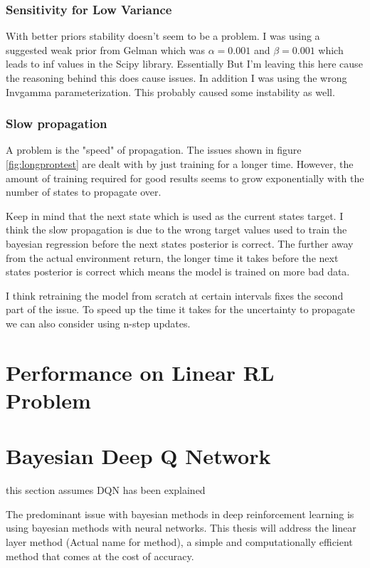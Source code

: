 \subsubsection{Sensitivity for Low Variance}

With better priors stability doesn't seem to be a problem. I was using a suggested weak prior from Gelman which was $\alpha=0.001$ and $\beta=0.001$ which leads to inf values in the Scipy library. Essentially But I'm leaving this here cause the reasoning behind this does cause issues. In addition I was using the wrong Invgamma parameterization. This probably caused some instability as well.

\subsubsection{Slow propagation}

A problem is the "speed" of propagation. The issues shown in figure \ref{fig:longproptest} are dealt with by just training for a longer time. However, the amount of training required for good results seems to grow exponentially with the number of states to propagate over.

Keep in mind that the next state which is used as the current states target. I think the slow propagation is due to the wrong target values used to train the bayesian regression before the next states posterior is correct. The further away from the actual environment return, the longer time it takes before the next states posterior is correct which means the model is trained on more bad data.

I think retraining the model from scratch at certain intervals fixes the second part of the issue. To speed up the time it takes for the uncertainty to propagate we can also consider using n-step updates.



\section{Performance on Linear RL Problem}



\section{Bayesian Deep Q Network}

\todo this section assumes DQN has been explained

The predominant issue with bayesian methods in deep reinforcement learning is using bayesian methods with neural networks. This thesis will address the linear layer method (\todo Actual name for method), a simple and computationally efficient method that comes at the cost of accuracy. 

